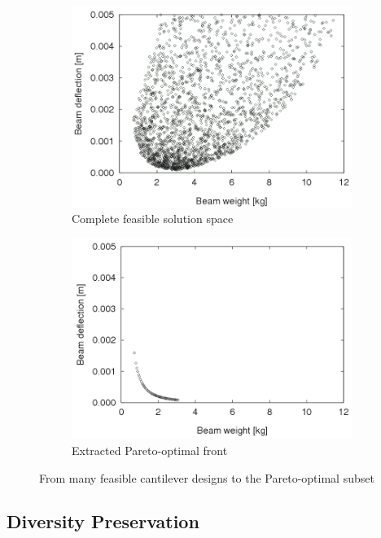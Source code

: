 \documentclass[journal,12pt,onecolumn]{IEEEtran}
\begin{document}
\begin{figure}[h]
\centering
\begin{subfigure}[b]{0.48\textwidth}
\includegraphics[width=\textwidth]{moo_feasible_space.png}
\caption{Complete feasible solution space}
\label{fig:moo_feasible}
\end{subfigure}
\hfill
\begin{subfigure}[b]{0.48\textwidth}
\includegraphics[width=\textwidth]{moo_pareto_front.png}
\caption{Extracted Pareto-optimal front}
\label{fig:moo_front}
\end{subfigure}
\caption{From many feasible cantilever designs to the Pareto-optimal subset}
\label{fig:moo_space_to_front}
\end{figure}

\subsection{Diversity Preservation}
\end{document}
